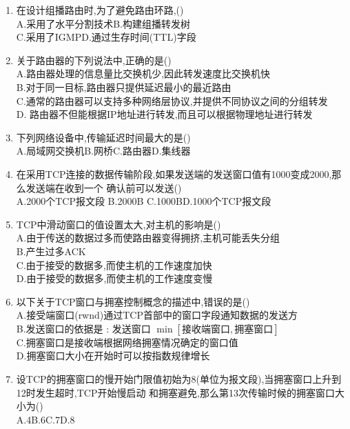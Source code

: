 \documentclass[12pt, a4paper, oneside, UTF8]{ctexbook}
\begin{document}
\begin{enumerate}
    \item 在设计组播路由时,为了避免路由环路,() \\
    A.采用了水平分割技术\qquad B.构建组播转发树\\ 
    C.采用了IGMP\qquad D.通过生存时间(TTL)字段 

    \item 关于路由器的下列说法中,正确的是() \\
    A.路由器处理的信息量比交换机少,因此转发速度比交换机快 \\
    B.对于同一目标,路由器只提供延迟最小的最近路由 \\
    C.通常的路由器可以支持多种网络层协议,并提供不同协议之间的分组转发 \\
    D. 路由器不但能根据IP地址进行转发,而且可以根据物理地址进行转发

    \item 下列网络设备中,传输延迟时间最大的是() \\
    A.局域网交换机\qquad B.网桥\qquad C.路由器\qquad D.集线器 

    \item 在采用TCP连接的数据传输阶段,如果发送端的发送窗口值有1000变成2000,那么发送端在收到一个
    确认前可以发送() \\
    A.2000个TCP报文段 \qquad B.2000B \qquad C.1000B\qquad D.1000个TCP报文段

    \item TCP中滑动窗口的值设置太大,对主机的影响是() \\
    A.由于传送的数据过多而使路由器变得拥挤,主机可能丢失分组 \\
    B.产生过多ACK \\
    C.由于接受的数据多,而使主机的工作速度加快 \\
    D.由于接受的数据多,而使主机的工作速度变慢 

    \item 以下关于TCP窗口与拥塞控制概念的描述中,错误的是() \\
    A.接受端窗口(rwnd)通过TCP首部中的窗口字段通知数据的发送方 \\
    B.发送窗口的依据是 : 发送窗口 $\min{\left[\text{接收端窗口},\text{拥塞窗口}\right]}$ \\
    C.拥塞窗口是接收端根据网络拥塞情况确定的窗口值 \\
    D.拥塞窗口大小在开始时可以按指数规律增长

    \item 设TCP的拥塞窗口的慢开始门限值初始为8(单位为报文段),当拥塞窗口上升到12时发生超时,TCP开始慢启动
    和拥塞避免,那么第13次传输时候的拥塞窗口大小为() \\
    A.4\qquad B.6\qquad C.7\qquad D.8


\end{enumerate}
\end{document}
